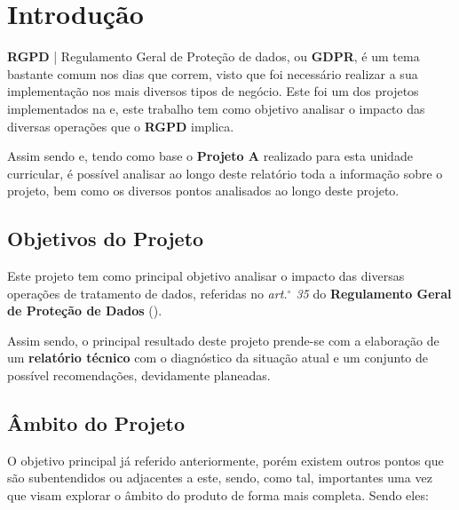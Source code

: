 \section{Introdução}

\textbf{RGPD} | Regulamento Geral de Proteção de dados, ou \textbf{GDPR}, é um tema bastante comum nos dias que correm, visto que foi necessário realizar a sua implementação nos mais diversos tipos de negócio. Este foi um dos projetos implementados na \textbf{} e, este trabalho tem como objetivo analisar o impacto das diversas operações que o \textbf{RGPD} implica.

Assim sendo e, tendo como base o \textbf{Projeto A} realizado para esta unidade curricular,  é possível analisar ao longo deste relatório toda a informação sobre o projeto, bem como os diversos pontos analisados ao longo deste projeto.

\subsection{Objetivos do Projeto}

Este projeto tem como principal objetivo analisar o impacto das diversas operações de tratamento de dados, referidas no \textit{art.$^\circ$ 35} do \textbf{Regulamento Geral de Proteção de Dados} ().

Assim sendo, o principal resultado deste projeto prende-se com a elaboração de um \textbf{relatório técnico} com o diagnóstico da situação atual e um conjunto de possível recomendações, devidamente planeadas.

\subsection{Âmbito do Projeto}

O objetivo principal já referido anteriormente, porém existem outros pontos que são subentendidos ou adjacentes a este, sendo, como tal, importantes uma vez que visam explorar o âmbito do produto de forma mais completa. Sendo eles:


